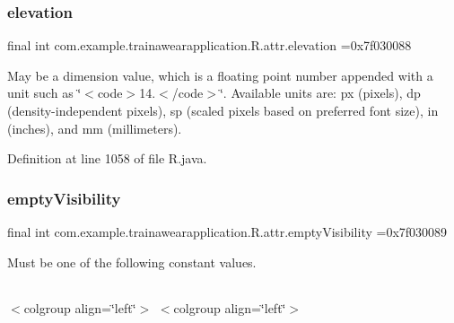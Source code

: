 \mbox{\label{classcom_1_1example_1_1trainawearapplication_1_1_r_1_1attr_acf5400ab8dca81e920825996b371cf38}} 
\subsubsection{\texorpdfstring{elevation}{elevation}}
{\footnotesize\ttfamily final int com.\+example.\+trainawearapplication.\+R.\+attr.\+elevation =0x7f030088\hspace{0.3cm}{\ttfamily [static]}}

May be a dimension value, which is a floating point number appended with a unit such as \char`\"{}$<$code$>$14.\+5sp$<$/code$>$\char`\"{}. Available units are\+: px (pixels), dp (density-\/independent pixels), sp (scaled pixels based on preferred font size), in (inches), and mm (millimeters). 

Definition at line 1058 of file R.\+java.

\mbox{\label{classcom_1_1example_1_1trainawearapplication_1_1_r_1_1attr_ab07bcf3071cb7408cfe75af143eb7c4d}} 
\subsubsection{\texorpdfstring{emptyVisibility}{emptyVisibility}}
{\footnotesize\ttfamily final int com.\+example.\+trainawearapplication.\+R.\+attr.\+empty\+Visibility =0x7f030089\hspace{0.3cm}{\ttfamily [static]}}

Must be one of the following constant values.

\tabulinesep=1mm
\begin{longtabu}spread 0pt [c]{*{0}{|X[-1]}|}
\hline
\end{longtabu}
$<$colgroup align=\char`\"{}left\char`\"{}$>$ $<$colgroup align=\char`\"{}left\char`\"{}$>$ 

